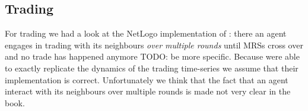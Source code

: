 \subsection{Trading}
For trading we had a look at the NetLogo implementation of \cite{weaver_replicating_nodate}: there an agent engages in trading with its neighbours \textit{over multiple rounds} until MRSs cross over and no trade has happened anymore TODO: be more specific. Because \cite{weaver_replicating_nodate} were able to exactly replicate the dynamics of the trading time-series we assume that their implementation is correct. Unfortunately we think that the fact that an agent interact with its neighbours over multiple rounds is made not very clear in the book.
